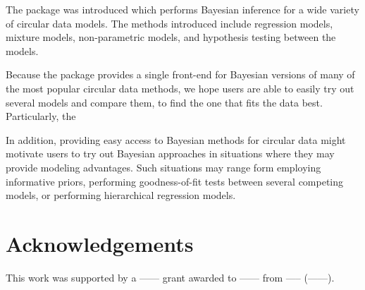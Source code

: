 The  package  was introduced which performs
Bayesian inference for a wide variety of circular data models. The
methods introduced include regression models, mixture models,
non-parametric models, and hypothesis testing between the models.

Because the package provides a single front-end for Bayesian versions of
many of the most popular circular data methods, we hope users are able
to easily try out several models and compare them, to find the one that
fits the data best. Particularly, the

In addition, providing easy access to Bayesian methods for circular data
might motivate users to try out Bayesian approaches in situations where
they may provide modeling advantages. Such situations may range form
employing informative priors, performing goodness-of-fit tests between
several competing models, or performing hierarchical regression models.

\hypertarget{acknowledgements}{%
\section{Acknowledgements}\label{acknowledgements}}

This work was supported by a ------ grant awarded to ------ from -----
(------).





